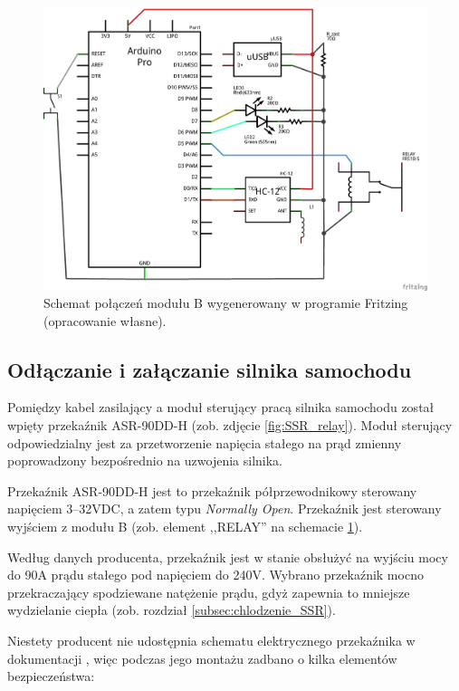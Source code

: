 \begin{figure}[H]
	\centering
	\includegraphics[scale=0.4]{schemas/schema_moduleB_schem.png}
	\caption{\label{fig:symbolic_schema_B}Schemat połączeń modułu B wygenerowany w programie Fritzing \cite{Fritzing} (opracowanie własne).}
\end{figure}

\subsection{Odłączanie i załączanie silnika samochodu}
\label{subsec:odlaczanie_zalaczanie_silnika}

Pomiędzy kabel zasilający a moduł sterujący pracą silnika samochodu został wpięty przekaźnik ASR-90DD-H (zob. zdjęcie \ref{fig:SSR_relay}). Moduł sterujący odpowiedzialny jest za przetworzenie napięcia stałego na prąd zmienny poprowadzony bezpośrednio na uzwojenia silnika.

Przekaźnik ASR-90DD-H jest to przekaźnik półprzewodnikowy sterowany napięciem 3–32VDC, a zatem typu \textit{Normally Open}. Przekaźnik jest sterowany wyjściem z modułu B (zob. element ,,RELAY'' na schemacie \ref{fig:symbolic_schema_B}).

Według danych producenta, przekaźnik jest w stanie obsłużyć na wyjściu mocy do 90A prądu stałego pod napięciem do 240V. Wybrano przekaźnik mocno przekraczający spodziewane natężenie prądu, gdyż zapewnia to mniejsze wydzielanie ciepła (zob. rozdział \ref{subsec:chlodzenie_SSR}).

Niestety producent nie udostępnia schematu elektrycznego przekaźnika w dokumentacji \cite{ASR90DDH}, więc podczas jego montażu zadbano o kilka elementów bezpieczeństwa:

